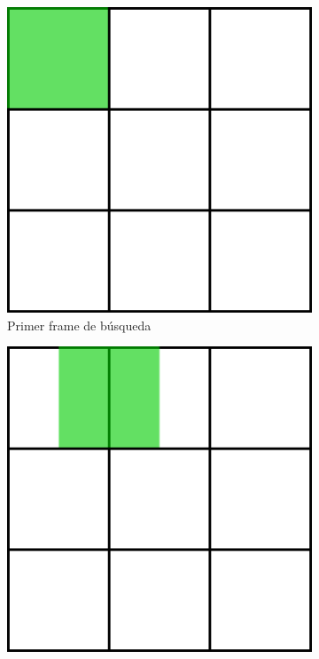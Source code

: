 \begin{figure}
	\centering
	\begin{subfigure}[b]{0.25\textwidth}
		\includegraphics[width=\textwidth]{img/primercuadrante.png}
		\caption{Primer frame de búsqueda}
		\label{frames_solapados_1}
	\end{subfigure}
	\quad
	\begin{subfigure}[b]{0.25\textwidth}
		\includegraphics[width=\textwidth]{img/segundocuadrante.png}

\end{subfigure}
\end{figure}
